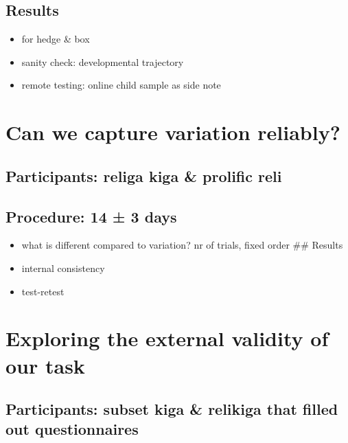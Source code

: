 \documentclass[
  english,
  man,floatsintext]{apa6}
\providecommand{\tightlist}{%
  \setlength{\itemsep}{0pt}\setlength{\parskip}{0pt}}
\begin{document}
\hypertarget{results-3}{%
\subsection{Results}\label{results-3}}

\begin{itemize}
\tightlist
\item
  for hedge \& box
\item
  sanity check: developmental trajectory
\item
  remote testing: online child sample as side note
\end{itemize}

\hypertarget{can-we-capture-variation-reliably}{%
\section{Can we capture variation reliably?}\label{can-we-capture-variation-reliably}}

\hypertarget{participants-religa-kiga-prolific-reli}{%
\subsection{Participants: religa kiga \& prolific reli}\label{participants-religa-kiga-prolific-reli}}

\hypertarget{procedure-14-3-days}{%
\subsection{Procedure: 14 ± 3 days}\label{procedure-14-3-days}}

\begin{itemize}
\tightlist
\item
  what is different compared to variation? nr of trials, fixed order
  \#\# Results
\item
  internal consistency
\item
  test-retest
\end{itemize}

\hypertarget{exploring-the-external-validity-of-our-task}{%
\section{Exploring the external validity of our task}\label{exploring-the-external-validity-of-our-task}}

\hypertarget{participants-subset-kiga-relikiga-that-filled-out-questionnaires}{%
\subsection{Participants: subset kiga \& relikiga that filled out questionnaires}\label{participants-subset-kiga-relikiga-that-filled-out-questionnaires}}
\end{document}
